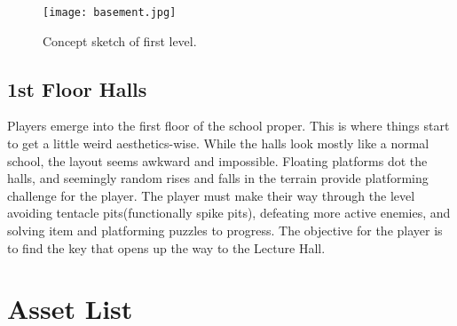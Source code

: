\documentclass [12pt]{article}
\begin{document}
\begin{figure}[!htb]
	\texttt{[image: basement.jpg]}
	\caption{Concept sketch of first level.}
\end{figure}
\newpage

\subsection*{1st Floor Halls}

Players emerge into the first floor of the school proper. This is where things start to get a little weird aesthetics-wise. While the halls look mostly like a normal school, the layout seems awkward and impossible. Floating platforms dot the halls, and seemingly random rises and falls in the terrain provide platforming challenge for the player. The player must make their way through the level avoiding tentacle pits(functionally spike pits), defeating more active enemies, and solving item and platforming puzzles to progress. The objective for the player is to find the key that opens up the way to the Lecture Hall.
\newpage

\section*{Asset List}
\end{document}

